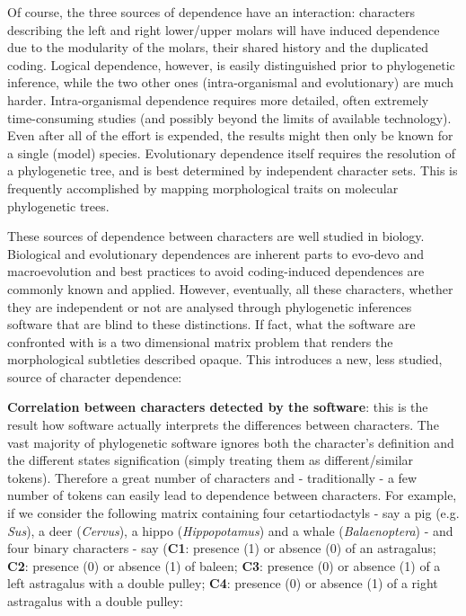 \documentclass[12pt,letterpaper]{article}
\begin{document}
\noindent Of course, the three sources of dependence have an interaction: characters describing the left and right lower/upper molars will have induced dependence due to the modularity of the molars, their shared history and the duplicated coding.
Logical dependence, however, is easily distinguished prior to phylogenetic inference, while the two other ones (intra-organismal and evolutionary) are much harder.
Intra-organismal dependence requires more detailed, often extremely time-consuming studies (and possibly beyond the limits of available technology).
Even after all of the effort is expended, the results might then only be known for a single (model) species.
Evolutionary dependence itself requires the resolution of a phylogenetic tree, and is best determined by independent character sets. 
This is frequently accomplished by mapping morphological traits on molecular phylogenetic trees.

These sources of dependence between characters are well studied in biology.
Biological and evolutionary dependences are inherent parts to evo-devo and macroevolution and best practices to avoid coding-induced dependences are commonly known and applied.
However, eventually, all these characters, whether they are independent or not are analysed through phylogenetic inferences software that are blind to these distinctions.
If fact, what the software are confronted with is a two dimensional matrix problem that renders the morphological subtleties described opaque.
This introduces a new, less studied, source of character dependence:

\noindent \textbf{Correlation between characters detected by the software}: this is the result how software actually interprets the differences between characters.
The vast majority of phylogenetic software ignores both the character's definition and the different states signification (simply treating them as different/similar tokens).
Therefore a great number of characters and - traditionally - a few number of tokens can easily lead to dependence between characters.
For example, if we consider the following matrix containing four cetartiodactyls - say a pig (e.g. \textit{Sus}), a deer (\textit{Cervus}), a hippo (\textit{Hippopotamus}) and a whale (\textit{Balaenoptera}) - and four binary characters - say (\textbf{C1}: presence (1) or absence (0) of an astragalus; \textbf{C2}: presence (0) or absence (1) of baleen; \textbf{C3}: presence (0) or absence (1) of a left astragalus with a double pulley; \textbf{C4}: presence (0) or absence (1) of a right astragalus with a double pulley:
\end{document}
